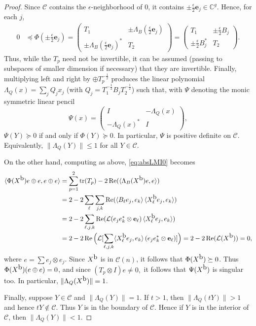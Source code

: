 \documentclass[12pt,makeidx]{amsart}
\DeclareMathOperator{\tr}{tr}
\numberwithin{equation}{section}
\def\bbF{ {\mathbb C}}
\def\cC{ {\mathcal C} }
\def\cL{ {\mathcal L} }
\def\oX{X^{\mbox{\rm{b}}}}
\def\be{\mathbf{e}}
\begin{document}
\begin{proof}
 Since $\cC$ contains the $\epsilon$-neighborhood of $0$,
  it contains $\pm \frac{\epsilon}{2} {\be_j}\in \bbF^g.$
  Hence, for each $j$,  
 \[
 \begin{split}
      0 & \preceq \Phi(\pm \frac{\epsilon}{2}{\be_j})  
      =  \begin{pmatrix}  T_1 & \pm \Lambda_B(\frac{\epsilon}{2}\be_j) \\ \pm \Lambda_B(\frac{\epsilon}{2} \be_j)^* & T_2 \end{pmatrix}   
      =  \begin{pmatrix}  T_1 & \pm \frac{\epsilon}{2} B_j \\ \pm \frac{\epsilon}{2} B_j^* &  T_2 \end{pmatrix}.
 \end{split}
 \] 
 Thus,  while the  $T_p$ need not be invertible, 
  it can be assumed (passing to subspaces of smaller dimension
  if necessary) that they are invertible. 
  Finally,
  multiplying left and right by $\oplus T_p^{-\frac12}$ produces the 
  linear polynomial  $\Lambda_Q(x) = \sum_j Q_j x_j$ (with $Q_j = T_1^{-\frac12} B_j T_2^{-\frac12}$)
  such that, with $\Psi$ denoting the monic symmetric linear pencil
\[
 \Psi(x) = \begin{pmatrix} I & -\Lambda_Q(x) \\ -\Lambda_Q(x)^* & I \end{pmatrix},
\]
 $\Psi(Y)\succeq 0$ if
  and only if $\Phi(Y) \succeq 0$. In particular, $\Psi$ is positive definite on $\cC$. Equivalently, $\|\Lambda_Q(Y)\|\le 1$ for all $Y\in \cC$. 


 On the other hand,  computing as above, \eqref{eq:absLMI0}  becomes
\[
 \begin{split}
  \langle \Phi(\oX) e\oplus e,e\oplus e \rangle & =  \sum_{p=1}^2 \tr(T_p) - 2 \operatorname{Re}(\langle \Lambda_B(\oX)e,e\rangle ) \\
   &=  2-2 \sum_{\ell} \sum_{j,k} \operatorname{Re}( \langle B_\ell e_j,e_k \rangle \, \langle \oX_\ell e_j, e_k\rangle)\\
   & = 2 - 2 \sum_{\ell,j,k}\operatorname{Re}( \cL(e_je_k^*\otimes \be_\ell) \, \langle \oX_\ell e_j, e_k\rangle) \\
   &= 2 -2 \operatorname{Re} \Big(\cL [\sum_{\ell,j,k}  \langle \oX_\ell e_j, e_k\rangle\, (e_je_k^*\otimes \be_\ell)] \Big) = 2- 2 \operatorname{Re}(\cL(\oX)) =0,
 \end{split}
\]
 where  $e=\sum e_j\otimes e_j$.
 Since $\oX$ is in $\cC(n)$, it follows that
  $\Phi(\oX)\succeq 0$.
  Thus $\Phi(\oX)(e \oplus e)=0$,
  and since $(T_p \otimes I) e \ne 0,$ it follows
  that $\Psi(\oX)$ is singular too.  In particular, $\|\Lambda_Q(\oX)\|=1$.  
 
  
 Finally, suppose $Y\in\cC$ and  $\|\Lambda_Q(Y)\|=1$. If $t>1$, then $\|\Lambda_Q(tY)\|>1$ and hence $tY\notin \cC$. Thus $Y$ is in the boundary of $\cC$. Hence  if $Y$ is in the interior of $\cC$, then $\|\Lambda_Q(Y)\|<1$.
\end{proof}
\end{document}
